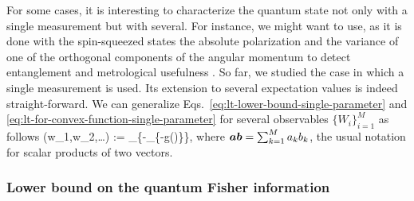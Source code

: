 For some cases, it is interesting to characterize the quantum state not only with a single measurement but with several.
For instance, we might want to use, as it is done with the spin-squeezed states the absolute polarization and the variance of one of the orthogonal components of the angular momentum to detect entanglement and metrological usefulness \cite{Pezze2009}.
So far, we studied the case in which a single measurement is used.
Its extension to several expectation values is indeed straight-forward.
We can generalize Eqs.~\eqref{eq:lt-lower-bound-single-parameter} and \eqref{eq:lt-for-convex-function-single-parameter} for several observables $\{W_i\}_{i=1}^M$ as follows \cite{Guehne2007}
\be
  \label{eq:lt-extension-bound-multiparameter}
  (w_1,w_2,\dots) := \sup_{}\big\{-\sup_{\rho}\{-g(\rho)\}\big\},
\ee
where $\boldsymbol{ab} =\sum_{k=1}^M a_kb_k$, the usual notation for scalar products of two vectors.

\subsubsection[Lower bound on the QFI]{Lower bound on the quantum Fisher information}

